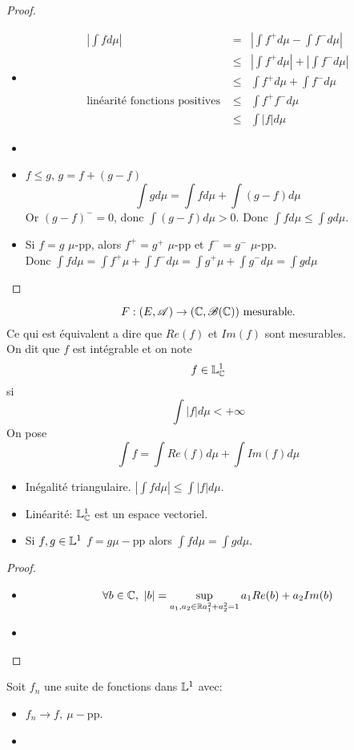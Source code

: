 \begin{proof}
	\begin{itemize}
		\item  \begin{eqnarray*}
			      |\int f d\mu| &=& \left|\int f^+ d\mu - \int f^- d\mu \right| \\
			      &\leq& \left|\int f^+ d\mu \right| + \left|\int f^- d\mu \right| \\
			      &\leq& \int f^+ d\mu + \int f^- d\mu  \\
			      \text{linéarité fonctions positives } &\leq& \int f^+ f^- d\mu  \\
			      &\leq& \int |f| d\mu
		      \end{eqnarray*}
		\item %
		\item $f \leq g$, $g = f + (g-f)$
		      $$\int g d\mu = \int f d\mu + \int (g-f) d \mu$$
		      Or $(g-f)^- = 0$, donc $\int (g-f) d\mu > 0$.
		      Donc $\int f d\mu \leq \int g d\mu$.
		\item Si $f = g$ $\mu$-pp, alors $f^+ = g^+$ $\mu$-pp et $f^- = g^-$ $\mu$-pp.\\
		      Donc $\int f d\mu = \int f^+ \mu + \int f^-  d\mu = \int g^+ \mu + \int g^-  d\mu = \int g d\mu$
	\end{itemize}
\end{proof}

\begin{definition}
	$$ F: (E, \mathscr{A}) \to (\mathbb{C}, \mathscr{B}(\mathbb{C})) \text{ mesurable.}$$
	Ce qui est équivalent a dire que $Re(f)$ et $Im(f)$ sont mesurables.\\
	On dit que $f$ est intégrable et on note
	$$ f\in \mathbb{L}^1_{\mathbb{C}}$$
	si $$\int |f| d\mu < +\infty$$
	On pose
	$$ \int f = \int Re(f) d\mu + \int Im(f) d\mu $$
\end{definition}


\begin{prop}
	\begin{itemize}
		\item Inégalité triangulaire. $\left| \int f d\mu \right| \leq \int |f| d \mu$.
		\item Linéarité: $\mathbb{L}^1_{\mathbb{C}}$ est un espace vectoriel.
		\item Si $f,g \in \mathbb{L}^1$ $f = g \mu-$pp alors $\int f d\mu = \int g d\mu$.
	\end{itemize}
\end{prop}


\begin{proof}
	\begin{itemize}
		\item $$\forall b \in \mathbb{C}, \ |b| = \sup_{a_1, a_2 \in \mathbb{R} \\ a_1^2 + a_2^2 = 1 } a_1 Re(b) + a_2 Im(b)$$
		\item
	\end{itemize}
\end{proof}



\begin{theorem}
	Soit $f_n$ une suite de fonctions dans $\mathbb{L}^1$ avec:
	\begin{itemize}
		\item $f_n \to f, \ \mu-$pp.
		\item %
	\end{itemize}
\end{theorem}

